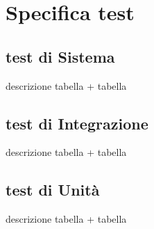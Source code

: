\chapter{Specifica test}


\section{test di Sistema}
descrizione tabella + tabella

\section{test di Integrazione}
descrizione tabella + tabella

\section{test di Unità}
descrizione tabella + tabella